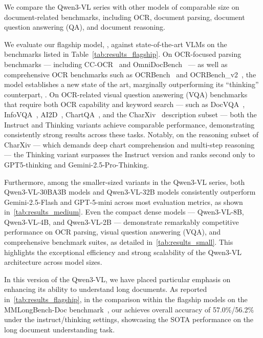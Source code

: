 We compare the Qwen3-VL series with other models of comparable size on document-related benchmarks, including OCR, document parsing, document question answering (QA), and document reasoning.

We evaluate our flagship model, \ModelBig, against state-of-the-art VLMs on the benchmarks listed in Table~\ref{tab:results_flagship}. On OCR-focused parsing benchmarks — including CC-OCR~\citep{yang2024ccocrcomprehensivechallengingocr} and OmniDocBench~\citep{ouyang2024omnidocbenchbenchmarkingdiversepdf} — as well as comprehensive OCR benchmarks such as OCRBench~\citep{Liu_2024_OCRBench} and OCRBench\_v2~\citep{fu2024ocrbenchv2improvedbenchmark}, the \InstructBig model establishes a new state of the art, marginally outperforming its “thinking” counterpart, \ThinkBig.
On OCR-related visual question answering (VQA) benchmarks that require both OCR capability and keyword search — such as DocVQA~\citep{docvqa}, InfoVQA~\citep{Mathew2021InfographicVQA}, AI2D~\citep{Kembhavi2016AI2D}, ChartQA~\citep{masry2022chartqa}, and the CharXiv~\citep{wang2024charxiv} description subset — both the Instruct and Thinking variants achieve comparable performance, demonstrating consistently strong results across these tasks.
Notably, on the reasoning subset of CharXiv — which demands deep chart comprehension and multi-step reasoning — the Thinking variant surpasses the Instruct version and ranks second only to GPT5-thinking and Gemini-2.5-Pro-Thinking.

Furthermore, among the smaller-sized variants in the Qwen3-VL series, both Qwen3-VL-30BA3B models and Qwen3-VL-32B models consistently outperform Gemini-2.5-Flash and GPT-5-mini across most evaluation metrics, as shown in~\cref{tab:results_medium}. Even the compact dense models — Qwen3-VL-8B, Qwen3-VL-4B, and Qwen3-VL-2B — demonstrate remarkably competitive performance on OCR parsing, visual question answering (VQA), and comprehensive benchmark suites, as detailed in~\cref{tab:results_small}. This highlights the exceptional efficiency and strong scalability of the Qwen3-VL architecture across model sizes.

In this version of the Qwen3-VL, we have placed particular emphasis on enhancing its ability to understand long documents. As reported in~\cref{tab:results_flagship}, in the comparison within the flagship models on the MMLongBench-Doc benchmark~\citep{ma2024mmlongbench}, our \ModelBig achieves overall accuracy of 57.0\%/56.2\% under the instruct/thinking settings, showcasing the SOTA performance on the long document understanding task.

